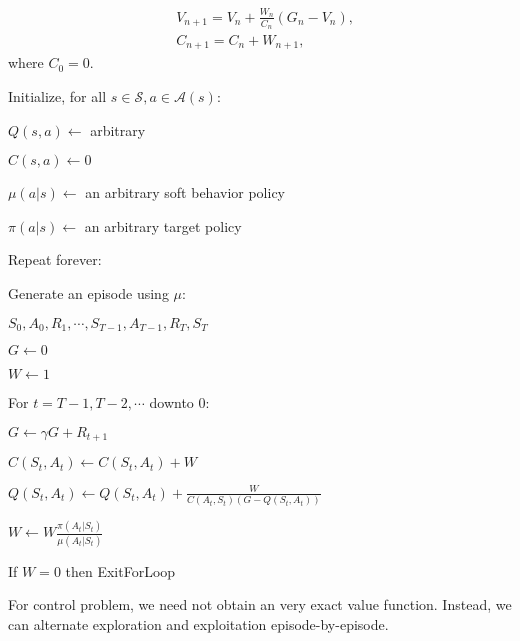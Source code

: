 \documentclass[11pt,a4paper]{article}
\def\S{{\mathcal S}}
\def\A{{\mathcal A}}
\begin{document}
\begin{eqnarray}
& V_{n+1} = V_n + \frac{W_n}{C_n}(G_n-V_n), \\ 
& C_{n+1} = C_n + W_{n+1},
\end{eqnarray}
where $C_0=0$.
\begin{tcolorbox}
Initialize, for all $s \in \S, a\in \A(s)$:\par 
\hspace{1cm} $Q(s,a) \leftarrow$ arbitrary \par 
\hspace{1cm} $C(s,a) \leftarrow 0$ \par 
\hspace{1cm} $\mu(a|s) \leftarrow$ an arbitrary soft behavior policy \par 
\hspace{1cm} $\pi(a|s) \leftarrow$ an arbitrary target policy \par 

Repeat forever:\par 
\hspace{1cm} Generate an episode using $\mu$: \par 
\hspace{2cm} $S_0,A_0,R_1,\cdots,S_{T-1},A_{T-1},R_T,S_T$\par 
\hspace{1cm} $G \leftarrow 0$ \par 
\hspace{1cm} $W \leftarrow 1$ \par 
\hspace{1cm} For $t = T-1, T-2, \cdots$ downto $0$:\par 
\hspace{2cm} $G \leftarrow \gamma G + R_{t+1}$\par 
\hspace{2cm} $C(S_t,A_t) \leftarrow C(S_t,A_t) + W$ \par 
\hspace{2cm} $Q(S_t,A_t) \leftarrow Q(S_t,A_t) + \frac{W}{C(A_t,S_t)(G - Q(S_t,A_t))}$ \par 
\hspace{2cm} $W \leftarrow W \frac{\pi(A_t|S_t)}{\mu(A_t|S_t)}$ \par 
\hspace{2cm} If $W = 0$ then ExitForLoop
\end{tcolorbox}
For control problem, we need not obtain an very exact value function. Instead, we can alternate exploration and exploitation episode-by-episode.
\end{document}
